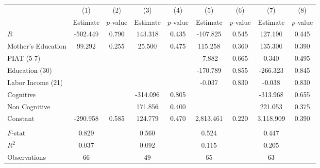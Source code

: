 \begin{tabular}{lcccccccc} \toprule
 & (1) & (2) & (3) & (4) & (5) & (6) & (7) & (8) \\ 
 & Estimate  & $p$-value  & Estimate  & $p$-value  & Estimate  & $p$-value  & Estimate  & $p$-value  \\  \midrule
$R$ &  -502.449 &     0.790 &   143.318 &     0.435 &  -107.825 &     0.545 &   127.190 &     0.445 \\  
Mother's Education &    99.292 &     0.255 &    25.500 &     0.475 &   115.258 &     0.360 &   135.300 &     0.390 \\  
PIAT (5-7) &         &         &         &         &    -7.882 &     0.665 &     0.340 &     0.495 \\  
Education (30) &         &         &         &         &  -170.789 &     0.855 &  -266.323 &     0.845 \\  
Labor Income (21) &         &         &         &         &    -0.037 &     0.830 &    -0.038 &     0.830 \\  
Cognitive &         &         &  -314.096 &     0.805 &         &         &  -313.968 &     0.655 \\  
Non Cognitive &         &         &   171.856 &     0.400 &         &         &   221.053 &     0.375 \\  
Constant &  -290.958 &     0.585 &   124.779 &     0.470 &  2,813.461 &     0.220 &  3,118.909 &     0.390 \\ \\  \midrule
$F$-stat &     0.829 &         &     0.560 &         &     0.524 &         &     0.447 &         \\  
$R^2$ &     0.037 &         &     0.092 &         &     0.115 &         &     0.205 &         \\
Observations &    66 &         &    49 &         &    65 &         &    63 &         \\  
\bottomrule \end{tabular}
